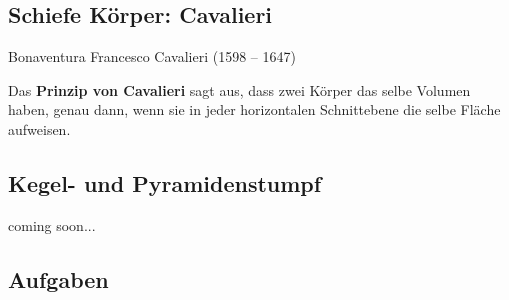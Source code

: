 \subsection{Schiefe Körper: Cavalieri}
Bonaventura Francesco Cavalieri (1598 – 1647)

Das \textbf{Prinzip von Cavalieri} sagt aus, dass zwei Körper das
selbe Volumen haben, genau dann, wenn sie in jeder horizontalen
Schnittebene die selbe Fläche aufweisen.
\newpage


\subsection{Kegel- und Pyramidenstumpf}
coming soon...
\subsection*{Aufgaben}
\newpage
